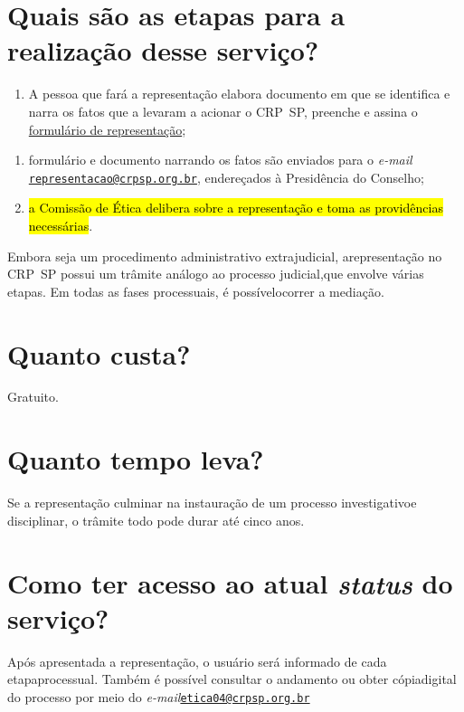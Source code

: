 \section{Quais são as etapas para a realização desse serviço?}

\begin{enumerate}
  \item  A pessoa que fará a representação elabora documento em que se  identifica e narra os fatos que a levaram a acionar o CRP~SP, preenche  e assina o \hyperref[]{formulário  de representação};
\end{enumerate}

\begin{enumerate}
  \item  formulário e documento narrando os fatos são enviados para o  \emph{e-mail}  \href{mailto:representacao@crpsp.org.br}{\nolinkurl{representacao@crpsp.org.br}},  endereçados à Presidência do Conselho;
  \item  \hl{a Comissão de Ética delibera sobre a representação e toma as  providências necessárias}.
\end{enumerate}

Embora seja um procedimento administrativo extrajudicial, arepresentação no CRP~SP possui um trâmite análogo ao processo judicial,que envolve várias etapas. Em todas as fases processuais, é possívelocorrer a mediação.

\section{Quanto custa?}

Gratuito.

\section{Quanto tempo leva?}

Se a representação culminar na instauração de um processo investigativoe disciplinar, o trâmite todo pode durar até cinco anos.

\section{Como ter acesso ao atual \emph{status} do serviço?}

Após apresentada a representação, o usuário será informado de cada etapaprocessual. Também é possível consultar o andamento ou obter cópiadigital do processo por meio do \emph{e-mail}\href{mailto:etica04@crpsp.org.br}{\nolinkurl{etica04@crpsp.org.br}}

